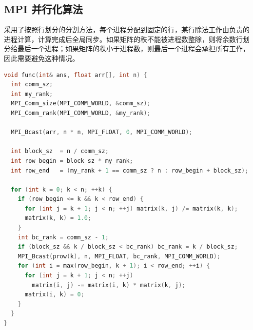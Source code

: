 \documentclass[a4paper]{article}
\begin{document}
\subsection{MPI 并行化算法}
采用了按照行划分的分割方法，每个进程分配到固定的行，某行除法工作由负责的进程计算，计算完成后全局同步。如果矩阵的秩不能被进程数整除，则将余数行划分给最后一个进程；如果矩阵的秩小于进程数，则最后一个进程会承担所有工作，因此需要避免这种情况。
\begin{lstlisting}[frame=trbl,language={C++}]
void func(int& ans, float arr[], int n) {
  int comm_sz;
  int my_rank;
  MPI_Comm_size(MPI_COMM_WORLD, &comm_sz);
  MPI_Comm_rank(MPI_COMM_WORLD, &my_rank);

  MPI_Bcast(arr, n * n, MPI_FLOAT, 0, MPI_COMM_WORLD);

  int block_sz  = n / comm_sz;
  int row_begin = block_sz * my_rank;
  int row_end   = (my_rank + 1 == comm_sz ? n : row_begin + block_sz);

  for (int k = 0; k < n; ++k) {
    if (row_begin <= k && k < row_end) {
      for (int j = k + 1; j < n; ++j) matrix(k, j) /= matrix(k, k);
      matrix(k, k) = 1.0;
    }
    int bc_rank = comm_sz - 1;
    if (block_sz && k / block_sz < bc_rank) bc_rank = k / block_sz;
    MPI_Bcast(prow(k), n, MPI_FLOAT, bc_rank, MPI_COMM_WORLD);
    for (int i = max(row_begin, k + 1); i < row_end; ++i) {
      for (int j = k + 1; j < n; ++j)
        matrix(i, j) -= matrix(i, k) * matrix(k, j);
      matrix(i, k) = 0;
    }
  }
}
\end{lstlisting}
\end{document}
